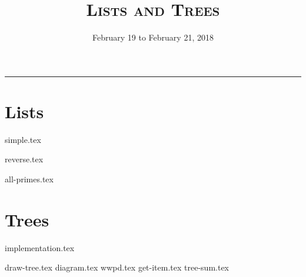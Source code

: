 \documentclass{exam}
\title{\textsc{Lists and Trees}}
\date{February 19 to February 21, 2018}
\begin{document}
\maketitle
\rule{\textwidth}{0.15em}
\fontsize{12}{15}\selectfont


\section{Lists}
\begin{questions}
{simple.tex}

\begin{blocksection}
{reverse.tex}
\end{blocksection}

\newpage
\begin{blocksection}
{all-primes.tex}
\end{blocksection}
\end{questions}

\newpage
\section{Trees}
{implementation.tex}
\begin{questions}
\vspace{5\baselineskip}
{draw-tree.tex}
\newpage
{diagram.tex}
{wwpd.tex}
\vspace{2\baselineskip}
{get-item.tex}
{tree-sum.tex}

\end{questions}
\end{document}
